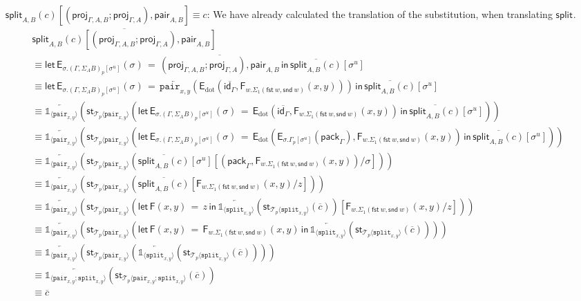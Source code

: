 \documentclass[10pt]{article}
\theoremstyle{definition}
\newcommand\dsd[1]{\ensuremath{\mathsf{#1}}}
\newcommand{\app}[2]{\ensuremath{#1 \: #2}}
\newcommand{\fst}[1]{\app{\dsd{fst}}{#1}}
\newcommand{\snd}[1]{\app{\dsd{snd}}{#1}}
\newcommand{\id}{\mathsf{id}}
\newcommand{\rewrite}[2]{\overleftarrow{#1}(#2)}
\newcommand\StI[2]{\ensuremath{\mathsf{st}_{#1}(#2)}}
\newcommand\FE[3]{\ensuremath{\mathsf{let} \, \mathsf{F}(#2) \, = \, {#1} \, \mathsf{in} \, #3}}
\newcommand\FIs[2]{\ensuremath{\mathsf{F}_{#1}{(#2)}}}
\newcommand\EEs[4]{\ensuremath{\mathsf{let} \, \mathsf{E}_{#1}(#3) \, = \, {#2} \, \mathsf{in} \, #4}}
\newcommand\EIs[2]{\ensuremath{\mathsf{E}_{#1}{(#2)}}}
\newcommand\ApEl[2]{\mathcal{T}_{#1}\langle#2\rangle}
\newcommand\pack[1]{\ensuremath{\mathsf{pack}_{#1}}}
\newcommand\unp[2]{\ensuremath{{#2}^u}}
\newcommand{\modeof}[1]{{#1}_p}
\newcommand{\sdot}{\ensuremath{\mathrm{dot}}}
\newcommand{\upstairs}[1]{\overline{#1}}
\newcommand\proj[1]{\ensuremath{\mathsf{proj}_{#1}}}
\newcommand\One{\ensuremath{\mathds{1}}}
\newcommand\ApOne[1]{\ensuremath{\One_{\langle {#1} \rangle }}}
\newcommand\pair[1]{\ensuremath{\mathtt{pair}_{#1}}}
\newcommand\tsplit[1]{\ensuremath{\mathtt{split}_{#1}}}
\newcommand\qpair[1]{\ensuremath{\mathsf{pair}_{#1}}}
\newcommand\qsplit[1]{\ensuremath{\mathsf{split}_{#1}}}
\begin{document}
\begin{enumerate}[style = multiline, labelwidth = 80pt]
\item[{$\qsplit{A,B}(c)\allowbreak[(\proj{\Gamma, A, B};\proj{\Gamma, A}), \allowbreak\qpair{A,B}] \equiv c$}:] 
We have already calculated the translation of the substitution, when translating $\qsplit{}$.
\begin{align*}
&\upstairs{\qsplit{A,B}(c)[(\proj{\Gamma, A, B};\proj{\Gamma, A}), \qpair{A,B}]} \\
&\equiv \EEs{\sigma.\modeof{(\Gamma, \Sigma_A B)}[\unp{\Gamma, \Sigma_A B}{\sigma}]}{\upstairs{(\proj{\Gamma, A, B};\proj{\Gamma, A}), \qpair{A,B}}}{\sigma}{\upstairs{\qsplit{A,B}(c)}[\unp{\Gamma, \Sigma_A B}{\sigma}]} \\
&\equiv \EEs{\sigma.\modeof{(\Gamma, \Sigma_A B)}[\unp{\Gamma, \Sigma_A B}{\sigma}]}{\rewrite{\pair{x,y}}{\EIs{\sdot}{\upstairs{\id_\Gamma},\FIs{w. \Sigma_1(\fst w, \snd w)}{x,y}}}}{\sigma}{\upstairs{\qsplit{A,B}(c)}[\unp{\Gamma, \Sigma_A B}{\sigma}]} \\
&\equiv \rewrite{\ApOne{\pair{x,y}}}{\StI{\ApEl{p}{\pair{x,y}}}{\EEs{\sigma.\modeof{(\Gamma, \Sigma_A B)}[\unp{\Gamma, \Sigma_A B}{\sigma}]}{\EIs{\sdot}{\upstairs{\id_\Gamma},\FIs{w. \Sigma_1(\fst w, \snd w)}{x,y}}}{\sigma}{\upstairs{\qsplit{A,B}(c)}[\unp{\Gamma, \Sigma_A B}{\sigma}]}}} \\
&\equiv \rewrite{\ApOne{\pair{x,y}}}{\StI{\ApEl{p}{\pair{x,y}}}{\EEs{\sigma.\modeof{(\Gamma, \Sigma_A B)}[\unp{\Gamma, \Sigma_A B}{\sigma}]}{\EIs{\sdot}{\EIs{\sigma.\modeof{\Gamma}[\unp{\Gamma}{\sigma}]}{\pack{\Gamma}},\FIs{w. \Sigma_1(\fst w, \snd w)}{x,y}}}{\sigma}{\upstairs{\qsplit{A,B}(c)}[\unp{\Gamma, \Sigma_A B}{\sigma}]}}} \\
&\equiv \rewrite{\ApOne{\pair{x,y}}}{\StI{\ApEl{p}{\pair{x,y}}}{\upstairs{\qsplit{A,B}(c)}[\unp{\Gamma, \Sigma_A B}{\sigma}][(\pack{\Gamma},\FIs{w. \Sigma_1(\fst w, \snd w)}{x,y})/\sigma]}} \\
&\equiv \rewrite{\ApOne{\pair{x,y}}}{\StI{\ApEl{p}{\pair{x,y}}}{\upstairs{\qsplit{A,B}(c)}[\FIs{w. \Sigma_1(\fst w, \snd w)}{x,y}/z]}} \\
&\equiv \rewrite{\ApOne{\pair{x,y}}}{\StI{\ApEl{p}{\pair{x,y}}}{\FE{z}{x,y}{\rewrite{\ApOne{\tsplit{x,y}}}{\StI{\ApEl{p}{\tsplit{x,y}}}{\upstairs{c}}}}[\FIs{w. \Sigma_1(\fst w, \snd w)}{x,y}/z]}} \\
&\equiv \rewrite{\ApOne{\pair{x,y}}}{\StI{\ApEl{p}{\pair{x,y}}}{\FE{\FIs{w. \Sigma_1(\fst w, \snd w)}{x,y}}{x,y}{\rewrite{\ApOne{\tsplit{x,y}}}{\StI{\ApEl{p}{\tsplit{x,y}}}{\upstairs{c}}}}}} \\
&\equiv \rewrite{\ApOne{\pair{x,y}}}{\StI{\ApEl{p}{\pair{x,y}}}{\rewrite{\ApOne{\tsplit{x,y}}}{\StI{\ApEl{p}{\tsplit{x,y}}}{\upstairs{c}}}}} \\
&\equiv \rewrite{\ApOne{\pair{x,y};\tsplit{x,y}}}{\StI{\ApEl{p}{\pair{x,y};\tsplit{x,y}}}{\upstairs{c}}} \\
&\equiv \upstairs{c}
\end{align*}
\end{enumerate}
\end{document}
